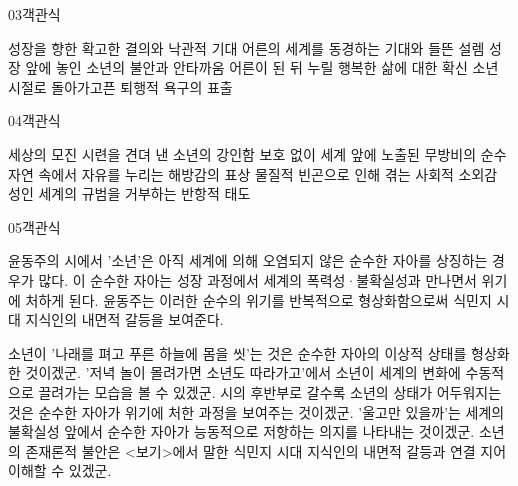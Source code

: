 \documentclass[fs85,seriesWit]{korfarm-base}
\begin{document}
\begin{kfQBlock}{03}{객관식}
\begin{kfChoices}
\kfChoice 성장을 향한 확고한 결의와 낙관적 기대
\kfChoice 어른의 세계를 동경하는 기대와 들뜬 설렘
\kfChoice 성장 앞에 놓인 소년의 불안과 안타까움
\kfChoice 어른이 된 뒤 누릴 행복한 삶에 대한 확신
\kfChoice 소년 시절로 돌아가고픈 퇴행적 욕구의 표출
\end{kfChoices}
\end{kfQBlock}

\begin{kfQBlock}{04}{객관식}
\begin{kfChoices}
\kfChoice 세상의 모진 시련을 견뎌 낸 소년의 강인함
\kfChoice 보호 없이 세계 앞에 노출된 무방비의 순수
\kfChoice 자연 속에서 자유를 누리는 해방감의 표상
\kfChoice 물질적 빈곤으로 인해 겪는 사회적 소외감
\kfChoice 성인 세계의 규범을 거부하는 반항적 태도
\end{kfChoices}
\end{kfQBlock}

\begin{kfQBlock}{05}{객관식}
\begin{kfEvidence}윤동주의 시에서 '소년'은 아직 세계에 의해 오염되지 않은 순수한 자아를 상징하는 경우가 많다. 이 순수한 자아는 성장 과정에서 세계의 폭력성·불확실성과 만나면서 위기에 처하게 된다. 윤동주는 이러한 순수의 위기를 반복적으로 형상화함으로써 식민지 시대 지식인의 내면적 갈등을 보여준다.\end{kfEvidence}
\begin{kfChoices}
\kfChoice 소년이 '나래를 펴고 푸른 하늘에 몸을 씻'는 것은 순수한 자아의 이상적 상태를 형상화한 것이겠군.
\kfChoice '저녁 놀이 몰려가면 소년도 따라가고'에서 소년이 세계의 변화에 수동적으로 끌려가는 모습을 볼 수 있겠군.
\kfChoice 시의 후반부로 갈수록 소년의 상태가 어두워지는 것은 순수한 자아가 위기에 처한 과정을 보여주는 것이겠군.
\kfChoice '울고만 있을까'는 세계의 불확실성 앞에서 순수한 자아가 능동적으로 저항하는 의지를 나타내는 것이겠군.
\kfChoice 소년의 존재론적 불안은 <보기>에서 말한 식민지 시대 지식인의 내면적 갈등과 연결 지어 이해할 수 있겠군.
\end{kfChoices}
\end{kfQBlock}

\kfEndMC
\end{document}
